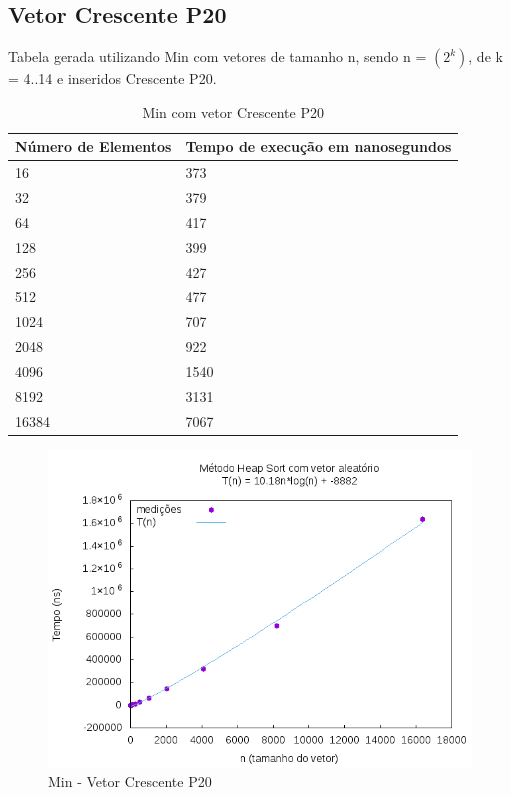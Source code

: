 \documentclass[12pt,a4paper,twoside]{report}
\begin{document}
\subsection{Vetor Crescente P20}
Tabela gerada utilizando Min com vetores de tamanho n, sendo n = $(2^k)$, de k = 4..14 e inseridos Crescente P20.
\begin{table}[H]
\centering
\caption{Min com vetor Crescente P20}
\label{my-label}
\begin{tabular}{|l|l|}
\hline
\multicolumn{1}{|c|}{\textbf{Número de Elementos}} & \multicolumn{1}{c|}{\textbf{Tempo de execução em nanosegundos}} \\ \hline
16 & 373 \\ \hline
32 & 379 \\ \hline
64 & 417 \\ \hline
128 & 399 \\ \hline
256 & 427 \\ \hline
512 & 477 \\ \hline
1024 & 707 \\ \hline
2048 & 922 \\ \hline
4096 & 1540 \\ \hline
8192 & 3131 \\ \hline
16384 & 7067 \\ \hline
\end{tabular}
\end{table}

\begin{figure}[H]
    \centering
    \includegraphics[width=0.7\linewidth]{graficos/HeapSort/vIntAleatorio/vIntAleatorio.png}
  \caption{Min - Vetor Crescente P20}
\end{figure}
\end{document}
